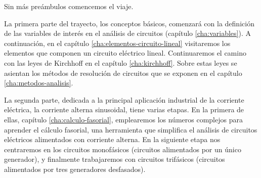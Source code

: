 Sin más preámbulos comencemos el viaje.

La primera parte del trayecto, los conceptos básicos, comenzará con la definición de las variables de interés en el análisis de circuitos (capítulo \ref{cha:variables}). A continuación, en el capítulo \ref{cha:elementos-circuito-lineal} visitaremos los elementos que componen un circuito eléctrico lineal. Continuaremos el camino con las leyes de Kirchhoff en el capítulo \ref{cha:kirchhoff}. Sobre estas leyes se asientan los métodos de resolución de circuitos que se exponen en el capítulo \ref{cha:metodos-analisis}.

La segunda parte, dedicada a la principal aplicación industrial de la corriente eléctrica, la corriente alterna sinusoidal, tiene varias etapas. En la primera de ellas, capítulo \ref{cha:calculo-fasorial},  emplearemos los números complejos para aprender el cálculo fasorial, una herramienta que simplifica el análisis de circuitos eléctricos alimentados con corriente alterna. En la siguiente etapa nos centraremos en los circuitos monofásicos (circuitos alimentados por un único generador), y finalmente trabajaremos con circuitos trifásicos (circuitos alimentados por tres generadores desfasados).

